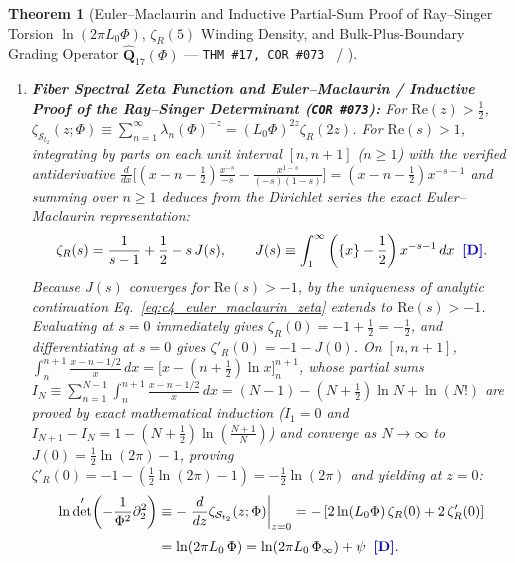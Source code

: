\documentclass[11pt,a4paper]{article}
\newcommand{\catD}{\text{\textbf{\textcolor{blue!75!black}{[D]}}}}
\newcommand{\catH}{\text{\textbf{\textcolor{orange!80!black}{[H]}}}}
\theoremstyle{definition}
\theoremstyle{plain}
\newtheorem{theorem}[axiom]{Theorem}
\theoremstyle{remark}
\begin{document}
\begin{theorem}[Euler--Maclaurin and Inductive Partial-Sum Proof of Ray--Singer Torsion $\ln(2\pi L_0\Phi)$, $\zeta_R(5)$ Winding Density, and Bulk-Plus-Boundary Grading Operator $\widehat{\mathbf{Q}}_{17}(\Phi)$ --- \texttt{THM~\#17, COR~\#073} \catD\ / \catH]\label{thm:c4_zeta_winding_q17_identities}
\leavevmode
\begin{enumerate}[label=(\roman*)]
  \item \textbf{Fiber Spectral Zeta Function and Euler--Maclaurin / Inductive Proof of the Ray--Singer Determinant (\texttt{COR~\#073}):}
  For $\mathrm{Re}(z) > \frac{1}{2}$, $\zeta_{\mathcal{S}_{t_2}}(z; \Phi) \equiv \sum_{n=1}^{\infty} \lambda_n(\Phi)^{-z} = (L_0\Phi)^{2z}\zeta_R(2z)$. For $\mathrm{Re}(s) > 1$, integrating by parts on each unit interval $[n, n+1]$ ($n \ge 1$) with the verified antiderivative $\frac{d}{dx}\big[(x - n - \frac{1}{2})\frac{x^{-s}}{-s} - \frac{x^{1-s}}{(-s)(1-s)}\big] = (x - n - \frac{1}{2})x^{-s-1}$ and summing over $n \ge 1$ deduces from the Dirichlet series the exact Euler--Maclaurin representation:
  \begin{equation}\label{eq:c4_euler_maclaurin_zeta}
  \zeta_R(s) = \frac{1}{s - 1} + \frac{1}{2} - s\,J(s), \qquad
  J(s) \equiv \int_1^\infty \left(\{x\} - \frac{1}{2}\right)x^{-s-1}\,dx \;\;\catD.
  \end{equation}
  Because $J(s)$ converges for $\mathrm{Re}(s) > -1$, by the uniqueness of analytic continuation Eq.~\eqref{eq:c4_euler_maclaurin_zeta} extends to $\mathrm{Re}(s) > -1$. Evaluating at $s = 0$ immediately gives $\zeta_R(0) = -1 + \frac{1}{2} = -\frac{1}{2}$, and differentiating at $s = 0$ gives $\zeta'_R(0) = -1 - J(0)$. On $[n, n+1]$, $\int_n^{n+1}\frac{x - n - 1/2}{x}\,dx = \big[x - (n+\frac{1}{2})\ln x\big]_n^{n+1}$, whose partial sums $I_N \equiv \sum_{n=1}^{N-1}\int_n^{n+1}\frac{x-n-1/2}{x}\,dx = (N - 1) - (N + \frac{1}{2})\ln N + \ln(N!)$ are proved by exact mathematical induction ($I_1 = 0$ and $I_{N+1} - I_N = 1 - (N + \frac{1}{2})\ln(\frac{N+1}{N})$) and converge as $N \to \infty$ to $J(0) = \frac{1}{2}\ln(2\pi) - 1$, proving $\zeta'_R(0) = -1 - (\frac{1}{2}\ln(2\pi) - 1) = -\frac{1}{2}\ln(2\pi)$ and yielding at $z = 0$:
  \begin{align}
  \ln\det'\!\left(-\frac{1}{\Phi^2}\partial_2^2\right) &\equiv -\left.\frac{d}{dz}\zeta_{\mathcal{S}_{t_2}}(z; \Phi)\right|_{z=0} = -\left[2\ln(L_0\Phi)\,\zeta_R(0) + 2\,\zeta'_R(0)\right] \nonumber \\[3pt]
  &= \ln\!\left(2\pi L_0\,\Phi\right) = \ln\!\left(2\pi L_0\,\Phi_\infty\right) + \psi \;\;\catD. \label{eq:c4_raysinger_linear_psi}

\end{align}
\end{enumerate}
\end{theorem}
\end{document}
